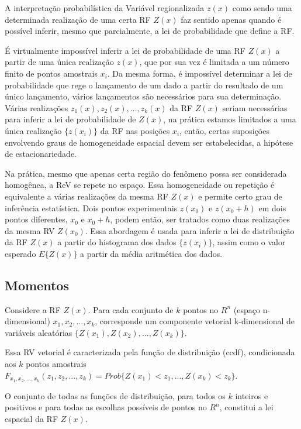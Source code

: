 A interpretação probabilística da Variável regionalizada $z(x)$ como sendo uma determinada realização de uma certa RF $Z(x)$ faz sentido apenas quando é possível inferir, mesmo que parcialmente, a lei de probabilidade que define a RF.
			
É virtualmente impossível inferir a lei de probabilidade de uma RF $Z(x)$ a partir de uma única realização $z(x)$, que por sua vez é limitada a um número finito de pontos amostrais $x_i$. Da mesma forma, é impossível determinar a lei de probabilidade que rege o lançamento de um dado a partir do resultado de um único lançamento, vários lançamentos são necessários para sua determinação. Várias realizações $z_1(x),z_2(x),...,z_k(x)$ da RF $Z(x)$ seriam necessárias para inferir a lei de probabilidade de $Z(x)$, na prática estamos limitados a uma única realização $\{z(x_i)\}$ da RF nas posições $x_i$, então, certas suposições envolvendo graus de homogeneidade espacial devem ser estabelecidas, a hipótese de estacionariedade.
			
Na prática, mesmo que apenas certa região do fenômeno possa ser considerada homogênea, a ReV se repete no espaço. Essa homogeneidade ou repetição é equivalente a várias realizações da mesma RF $Z(x)$ e permite certo grau de inferência estatística. Dois pontos experimentais $z(x_0)$ e $z(x_0+h)$ em dois pontos diferentes, $x_0$ e $x_0+h$, podem então, ser tratados como duas realizações da mesma RV $Z(x_0)$. Essa abordagem é usada para inferir a lei de distribuição da RF $Z(x)$ a partir do histograma dos dados $\{z(x_i)\}$, assim como o valor esperado $E\{Z(x)\}$ a partir da média aritmética dos dados.
			
\subsection{Momentos}
		
Considere a RF $Z(x)$. Para cada conjunto de $k$ pontos no $R^n$ (espaço n-dimensional) $x_1,x_2,...,x_k$, corresponde um componente vetorial k-dimensional de variáveis aleatórias  $\{Z(x_1),Z(x_2),...,Z(x_k)\}$.
			
Essa RV vetorial é caracterizada pela função de distribuição (ccdf), condicionada aos $k$ pontos amostrais $F_{x_1,x_2,...,x_k}(z_1,z_2,...,z_k)=Prob\{Z(x_1)<z_1,...,Z(x_k)<z_k\}$.
			
O conjunto de todas as funções de distribuição, para todos os $k$ inteiros e positivos e para todas as escolhas possíveis de pontos no $R^n$, constitui a lei espacial da RF $Z(x)$.
			
